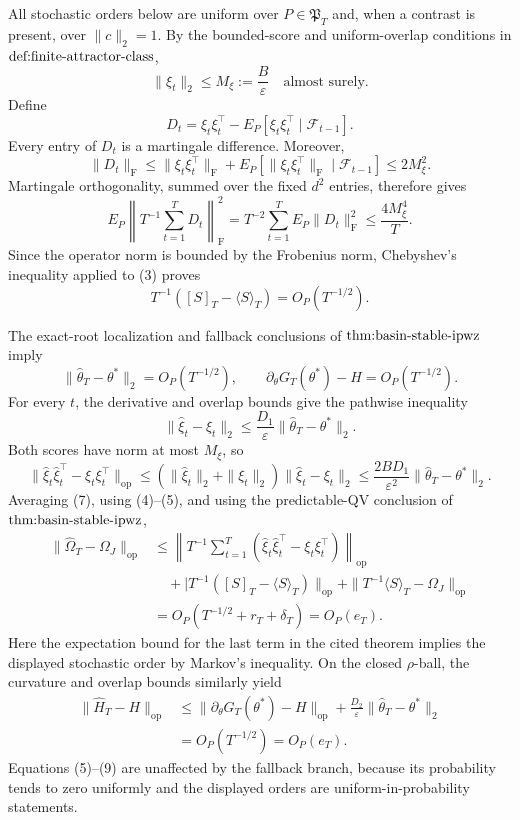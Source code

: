 All stochastic orders below are uniform over \(P\in\mathfrak P_T\) and, when a contrast is present, over \(\|c\|_2=1\). By the bounded-score and uniform-overlap conditions in \(\textnormal{def:finite-attractor-class}\),
\[
 \|\xi_t\|_2\le M_\xi:=\frac{B}{\varepsilon}
 \quad\text{almost surely}. \tag{1}
\]
Define
\[
 D_t=\xi_t\xi_t^\top-E_P[\xi_t\xi_t^\top\mid\mathcal F_{t-1}].
\]
Every entry of \(D_t\) is a martingale difference. Moreover,
\[
 \|D_t\|_{\mathrm F}
 \le \|\xi_t\xi_t^\top\|_{\mathrm F}
   +E_P[\|\xi_t\xi_t^\top\|_{\mathrm F}\mid\mathcal F_{t-1}]
 \le 2M_\xi^2. \tag{2}
\]
Martingale orthogonality, summed over the fixed \(d^2\) entries, therefore gives
\[
 E_P\left\|T^{-1}\sum_{t=1}^TD_t\right\|_{\mathrm F}^2
 =T^{-2}\sum_{t=1}^TE_P\|D_t\|_{\mathrm F}^2
 \le \frac{4M_\xi^4}{T}. \tag{3}
\]
Since the operator norm is bounded by the Frobenius norm, Chebyshev's inequality applied to (3) proves
\[
 T^{-1}([S]_T-\langle S\rangle_T)=O_P(T^{-1/2}). \tag{4}
\]

The exact-root localization and fallback conclusions of \(\textnormal{thm:basin-stable-ipwz}\) imply
\[
 \|\widehat\theta_T-\theta^*\|_2=O_P(T^{-1/2}),
 \qquad
 \partial_\theta G_T(\theta^*)-H=O_P(T^{-1/2}). \tag{5}
\]
For every \(t\), the derivative and overlap bounds give the pathwise inequality
\[
 \|\widehat\xi_t-\xi_t\|_2
 \le \frac{D_1}{\varepsilon}\|\widehat\theta_T-\theta^*\|_2. \tag{6}
\]
Both scores have norm at most \(M_\xi\), so
\[
 \|\widehat\xi_t\widehat\xi_t^\top-
       \xi_t\xi_t^\top\|_{\mathrm{op}}
 \le (\|\widehat\xi_t\|_2+\|\xi_t\|_2)
       \|\widehat\xi_t-\xi_t\|_2
 \le \frac{2BD_1}{\varepsilon^2}
       \|\widehat\theta_T-\theta^*\|_2. \tag{7}
\]
Averaging (7), using (4)--(5), and using the predictable-QV conclusion of \(\textnormal{thm:basin-stable-ipwz}\),
\[
 \begin{aligned}
 \|\widehat\Omega_T-\Omega_J\|_{\mathrm{op}}
 &\le \left\|T^{-1}\sum_{t=1}^T
   (\widehat\xi_t\widehat\xi_t^\top-
    \xi_t\xi_t^\top)\right\|_{\mathrm{op}}\\
 &\quad+|T^{-1}([S]_T-\langle S\rangle_T)\|_{\mathrm{op}}
 +\|T^{-1}\langle S\rangle_T-\Omega_J\|_{\mathrm{op}}\\
 &=O_P(T^{-1/2}+r_T+\delta_T)=O_P(e_T). \tag{8}
 \end{aligned}
\]
Here the expectation bound for the last term in the cited theorem implies the displayed stochastic order by Markov's inequality. On the closed \(\rho\)-ball, the curvature and overlap bounds similarly yield
\[
 \begin{aligned}
 \|\widehat H_T-H\|_{\mathrm{op}}
 &\le \|\partial_\theta G_T(\theta^*)-H\|_{\mathrm{op}}
 +\frac{D_2}{\varepsilon}\|\widehat\theta_T-\theta^*\|_2\\
 &=O_P(T^{-1/2})=O_P(e_T). \tag{9}
 \end{aligned}
\]
Equations (5)--(9) are unaffected by the fallback branch, because its probability tends to zero uniformly and the displayed orders are uniform-in-probability statements.

